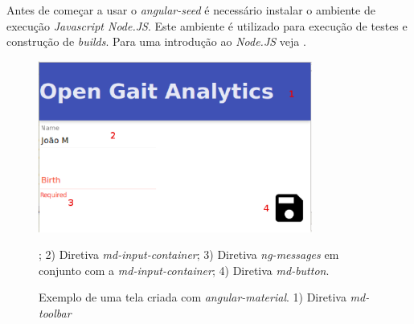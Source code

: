 Antes de começar a usar o \emph{angular-seed} é necessário instalar o ambiente de execução \emph{Javascript Node.JS}. 
Este ambiente é utilizado para execução de testes e construção de \emph{builds}. Para uma introdução ao \emph{Node.JS} veja \cite{Syed2014}.

\begin{figure}[ht]
	\centering
	\includegraphics[width=9cm]{figuras/material_amostra.eps}
	\caption[Exemplo de uma tela criada com \emph{angular-material}.]{Exemplo de uma tela criada com \emph{angular-material}. 1) Diretiva \emph{md-toolbar}}; 2) Diretiva \emph{md-input-container}; 3) Diretiva \emph{ng-messages} em conjunto com a \emph{md-input-container}; 4) Diretiva \emph{md-button}.
	\label{material_amostra}
\end{figure}

